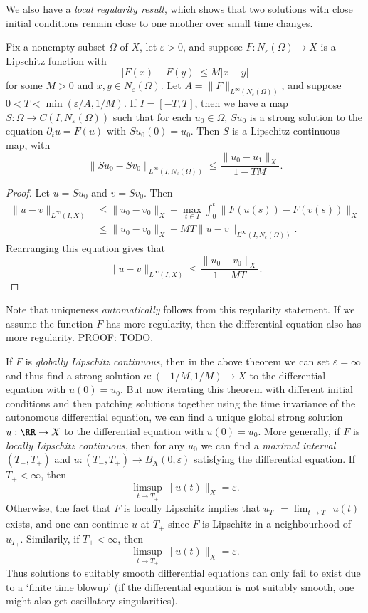 We also have a \emph{local regularity result}, which shows that two solutions with close initial conditions remain close to one another over small time changes.

\begin{theorem}
    Fix a nonempty subset $\Omega$ of $X$, let $\varepsilon > 0$, and suppose $F: N_\varepsilon(\Omega) \to X$ is a Lipschitz function with
    \[ |F(x) - F(y)| \leq M |x - y| \]
    for some $M > 0$ and $x,y \in N_\varepsilon(\Omega)$. Let $A = \| F \|_{L^\infty(N_\varepsilon(\Omega))}$, and suppose $0 < T < \min(\varepsilon/A,1/M)$. If $I = [-T,T]$, then we have a map $S: \Omega \to C(I,N_\varepsilon(\Omega))$ such that for each $u_0 \in \Omega$, $Su_0$ is a strong solution to the equation $\partial_t u = F(u)$ with $Su_0(0) = u_0$. Then $S$ is a Lipschitz continuous map, with
    \[ \| Su_0 - Sv_0 \|_{L^\infty(I,N_\varepsilon(\Omega))} \leq \frac{\| u_0 - u_1 \|_X}{1 - TM}. \]
\end{theorem}
\begin{proof}
    Let $u = Su_0$ and $v = Sv_0$. Then
    \begin{align*}
        \| u - v \|_{L^\infty(I,X)} &\leq \| u_0 - v_0 \|_X + \max_{t \in I} \int_0^t \| F(u(s)) - F(v(s)) \|_X\\
        &\leq \| u_0 - v_0 \|_X + MT \| u - v \|_{L^\infty(I,N_\varepsilon(\Omega))}.
    \end{align*}
    Rearranging this equation gives that
    \[ \| u - v \|_{L^\infty(I,X)} \leq \frac{\| u_0 - v_0 \|_X}{1 - MT}. \]
\end{proof}

Note that uniqueness \emph{automatically} follows from this regularity statement. If we assume the function $F$ has more regularity, then the differential equation also has more regularity. PROOF: TODO.

If $F$ is \emph{globally Lipschitz continuous}, then in the above theorem we can set $\varepsilon = \infty$ and thus find a strong solution $u: (-1/M,1/M) \to X$ to the differential equation with $u(0) = u_0$. But now iterating this theorem with different initial conditions and then patching solutions together using the time invariance of the autonomous differential equation, we can find a unique global strong solution $u: \RR \to X$ to the differential equation with $u(0) = u_0$. More generally, if $F$ is \emph{locally Lipschitz continuous}, then for any $u_0$ we can find a \emph{maximal interval} $(T_-,T_+)$ and $u: (T_-,T_+) \to B_X(0,\varepsilon)$ satisfying the differential equation. If $T_+ < \infty$, then
%
\[ \limsup_{t \to T_+} \| u(t) \|_X = \varepsilon. \]
%
Otherwise, the fact that $F$ is locally Lipschitz implies that $u_{T_+} = \lim_{t \to T_+} u(t)$ exists, and one can continue $u$ at $T_+$ since $F$ is Lipschitz in a neighbourhood of $u_{T_+}$. Similarily, if $T_+ < \infty$, then
%
\[ \limsup_{t \to T_+} \| u(t) \|_X = \varepsilon. \]
%
Thus solutions to suitably smooth differential equations can only fail to exist due to a `finite time blowup' (if the differential equation is not suitably smooth, one might also get oscillatory singularities).

